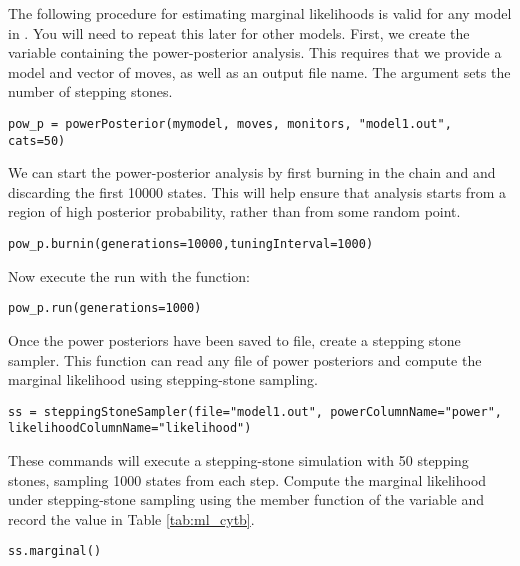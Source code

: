 The following procedure for estimating marginal likelihoods is valid for any model in \RevBayes.
You will need to repeat this later for other models.
First, we create the variable containing the power-posterior analysis. 
This requires that we provide a model and vector of moves, as well as an output file name. 
The  argument sets the number of stepping stones.
{\tt \begin{snugshade*}
\begin{lstlisting}
pow_p = powerPosterior(mymodel, moves, monitors, "model1.out", cats=50) 
\end{lstlisting}
\end{snugshade*}}

We can start the power-posterior analysis by first burning in the chain and and discarding the first 10000 states.  
This will help ensure that analysis starts from a region of high posterior probability, rather than from some random point.
{\tt \begin{snugshade*}
\begin{lstlisting}
pow_p.burnin(generations=10000,tuningInterval=1000)
\end{lstlisting}
\end{snugshade*}}

Now execute the run with the  function:
{\tt \begin{snugshade*}
\begin{lstlisting}
pow_p.run(generations=1000)  
\end{lstlisting}
\end{snugshade*}}

Once the power posteriors have been saved to file, create a stepping stone sampler. 
This function can read any file of power posteriors and compute the marginal likelihood using stepping-stone sampling. 
{\tt \small \begin{snugshade*}
\begin{lstlisting}
ss = steppingStoneSampler(file="model1.out", powerColumnName="power", likelihoodColumnName="likelihood")
\end{lstlisting}
\end{snugshade*}}

These commands will execute a stepping-stone simulation with 50 stepping stones, sampling 1000 states from each step. 
Compute the marginal likelihood under stepping-stone sampling using the member function  of the  variable and record the value in Table \ref{tab:ml_cytb}.
{\tt \begin{snugshade*}
\begin{lstlisting}
ss.marginal() 
\end{lstlisting}
\end{snugshade*}}

